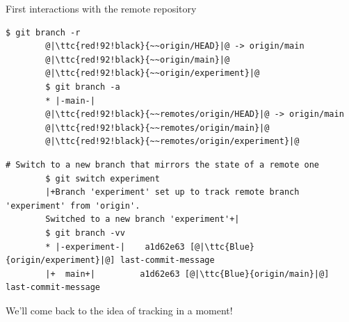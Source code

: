 \documentclass[usenames,svgnames,14pt]{beamer}
\newcommand{\ttc}[2]{\texttt{\textcolor{#1}{#2}}}%
\begin{document}
\begin{frame}[fragile]{First interactions with the remote repository}
    \begin{lstlisting}[style=MyBash]
        $ git branch -r
        @|\ttc{red!92!black}{~~origin/HEAD}|@ -> origin/main
        @|\ttc{red!92!black}{~~origin/main}|@
        @|\ttc{red!92!black}{~~origin/experiment}|@
        $ git branch -a
        * |-main-|
        @|\ttc{red!92!black}{~~remotes/origin/HEAD}|@ -> origin/main
        @|\ttc{red!92!black}{~~remotes/origin/main}|@
        @|\ttc{red!92!black}{~~remotes/origin/experiment}|@
    \end{lstlisting}
    \begin{lstlisting}[style=MyBash]
        # Switch to a new branch that mirrors the state of a remote one
        $ git switch experiment
        |+Branch 'experiment' set up to track remote branch 'experiment' from 'origin'.
        Switched to a new branch 'experiment'+|
        $ git branch -vv
        * |-experiment-|    a1d62e63 [@|\ttc{Blue}{origin/experiment}|@] last-commit-message
        |+  main+|         a1d62e63 [@|\ttc{Blue}{origin/main}|@] last-commit-message
    \end{lstlisting}
    \medskip
    \centerline{We'll come back to the idea of tracking in a moment!}
\end{frame}
\end{document}
